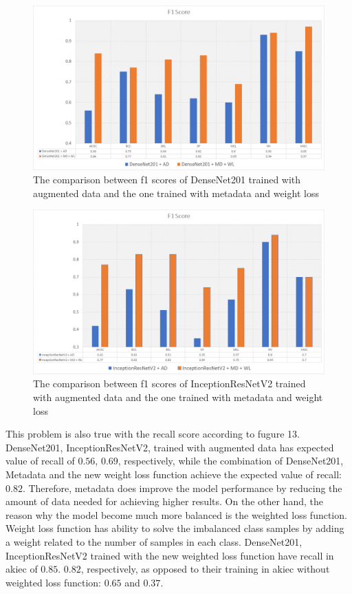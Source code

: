 \documentclass[sensors,article,submit,pdftex,moreauthors]{Definitions/mdpi}
\begin{document}
\begin{figure}[H]
	\centering
	\includegraphics[width=1\linewidth]{Definitions/den f1}
	\caption{The comparison between f1 scores of DenseNet201 trained with augmented data and the one trained with metadata and weight loss}
	\label{fig:den f1}
\end{figure}
\begin{figure}[H]
	\centering
	\includegraphics[width=1\linewidth]{Definitions/in f1}
	\caption{The comparison between f1 scores of InceptionResNetV2 trained with augmented data and the one trained with metadata and weight loss}
	\label{fig:incep f1}
\end{figure}

This problem is also true with the recall score according to fugure 13. DenseNet201, InceptionResNetV2, trained with augmented data has expected value of recall of $0.56$, $0.69$, respectively, while the combination of DenseNet201, Metadata and the new weight loss function achieve the expected value of recall: $0.82$. Therefore, metadata does improve the model performance by reducing the amount of data needed for achieving higher results. On the other hand, the reason why the model become much more balanced is the weighted loss function. Weight loss function has ability to solve the imbalanced class samples by adding a weight related to the number of samples in each class. DenseNet201, InceptionResNetV2 trained with the new weighted loss function have recall in akiec of $0.85$. $0.82$, respectively, as opposed to their training in akiec without weighted loss function: $0.65$ and $0.37$. 
\end{document}
